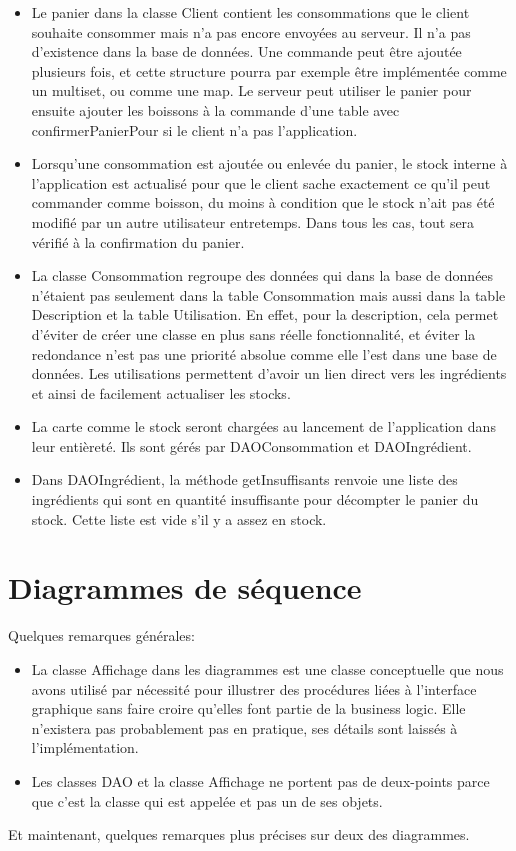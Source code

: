 \documentclass[a4paper,10pt]{article}
\begin{document}
\begin{itemize}
    \item Le panier dans la classe Client contient les consommations que le client souhaite consommer mais n'a pas encore envoyées au serveur. Il n'a pas d'existence dans la base de données. Une commande peut être ajoutée plusieurs fois, et cette structure pourra par exemple être implémentée comme un multiset, ou comme une map. Le serveur peut utiliser le panier pour ensuite ajouter les boissons à la commande d'une table avec confirmerPanierPour si le client n'a pas l'application.
    \item Lorsqu'une consommation est ajoutée ou enlevée du panier, le stock interne à l'application est actualisé pour que le client sache exactement ce qu'il peut commander comme boisson, du moins à condition que le stock n'ait pas été modifié par un autre utilisateur entretemps. Dans tous les cas, tout sera vérifié à la confirmation du panier.
    \item La classe Consommation regroupe des données qui dans la base de données n'étaient pas seulement dans la table Consommation mais aussi dans la table Description et la table Utilisation. En effet, pour la description, cela permet d'éviter de créer une classe en plus sans réelle fonctionnalité, et éviter la redondance n'est pas une priorité absolue comme elle l'est dans une base de données. Les utilisations permettent d'avoir un lien direct vers les ingrédients et ainsi de facilement actualiser les stocks.
    \item La carte comme le stock seront chargées au lancement de l'application dans leur entièreté. Ils sont gérés par DAOConsommation et DAOIngrédient.
    \item Dans DAOIngrédient, la méthode getInsuffisants renvoie une liste des ingrédients qui sont en quantité insuffisante pour décompter le panier du stock. Cette liste est vide s'il y a assez en stock.
\end{itemize}

\section{Diagrammes de séquence}

Quelques remarques générales:
\begin{itemize}
    \item La classe Affichage dans les diagrammes est une classe conceptuelle que nous avons utilisé par nécessité pour illustrer des procédures liées à l'interface graphique sans faire croire qu'elles font partie de la business logic. Elle n'existera pas probablement pas en pratique, ses détails sont laissés à l'implémentation.
    \item Les classes DAO et la classe Affichage ne portent pas de deux-points parce que c'est la classe qui est appelée et pas un de ses objets.
\end{itemize}
Et maintenant, quelques remarques plus précises sur deux des diagrammes.
\end{document}
